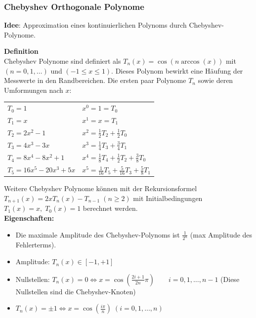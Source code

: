 \newpage
\subsubsection{Chebyshev Orthogonale Polynome} \label{sssec:chebyshev_polynom}
\textbf{Idee}: Approximation eines kontinuierlichen Polynoms durch Chebyshev-Polynome.

\textbf{Definition}\\
Chebyshev Polynome sind definiert als $\boxed{T_n(x) = \cos(n \arccos(x))}$ mit $(n = 0,1,\ldots)$ und $(-1 \leq x \leq 1)$. Dieses
Polynom bewirkt eine Häufung der Messwerte in den Randbereichen. Die
ersten paar Polynome $T_n$ sowie deren Umformungen nach $x$:\\
\begin{tabular}{ll}
  $T_0 = 1$ & $x^0 = 1 = T_0$ \\
  $T_1 = x$ & $x^1 = x = T_1$ \\
  $T_2 = 2x^2 -1$ & $x^2 = \frac12 T_2 + \frac12 T_0$ \\
  $T_3 = 4x^3 - 3x$ & $x^3 = \frac14 T_3 + \frac34 T_1$\\
  $T_4 = 8x^4 -8x^2 + 1$ & $x^4 = \frac18 T_4 + \frac12 T_2 + \frac38 T_0$\\
  $T_5 = 16x^5 - 20x^3 + 5x$ & $x^5 = \frac{1}{16} T_5 + \frac{5}{16} T_3 + \frac58 T_1$\\
\end{tabular}

Weitere Chebyshev Polynome können mit der Rekursionsformel $T_{n+1}(x) = 2x T_n(x)-T_{n-1}\;(n\geq2)$
mit Initialbedingungen $T_1(x)=x,\;T_0(x)=1$ berechnet werden.\\

\textbf{Eigenschaften: }
\begin{itemize}
  \item Die maximale Amplitude des Chebyshev-Polynoms ist $\frac{1}{2^n}$ (max Amplitude des Fehlerterms).
  \item Amplitude: $T_n(x) \in [-1,+1]$
  \item Nullstellen: $T_n(x)=0 \Leftrightarrow x=\cos(\frac{2i+1}{2n}\pi)\qquad i=0,1,\ldots,n-1$ (Diese Nullstellen sind die Chebyshev-Knoten)
  \item $T_n(x)= \pm 1 \Leftrightarrow x=\cos(\frac{i\pi}{n}) \; (i=0,1,\ldots,n)$
\end{itemize}

